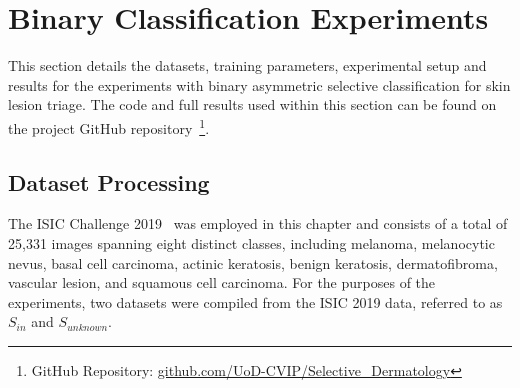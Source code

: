 \section{Binary Classification Experiments}
\label{sec:selective_binary_experiment}
This section details the datasets, training parameters, experimental setup and results for the experiments with binary asymmetric selective classification for skin lesion triage. The code and full results used within this section can be found on the project GitHub repository~\footnote{GitHub Repository: \url{github.com/UoD-CVIP/Selective_Dermatology}}.

\subsection{Dataset Processing}
\label{subsec:selective_binary_dataset}
The ISIC Challenge 2019~\citep{codella2018skin,combalia2019bcn20000,tschandl2018ham10000} was employed in this chapter and consists of a total of 25,331 images spanning eight distinct classes, including melanoma, melanocytic nevus, basal cell carcinoma, actinic keratosis, benign keratosis, dermatofibroma, vascular lesion, and squamous cell carcinoma. For the purposes of the experiments, two datasets were compiled from the ISIC 2019 data, referred to as $S_{in}$ and $S_{unknown}$.

